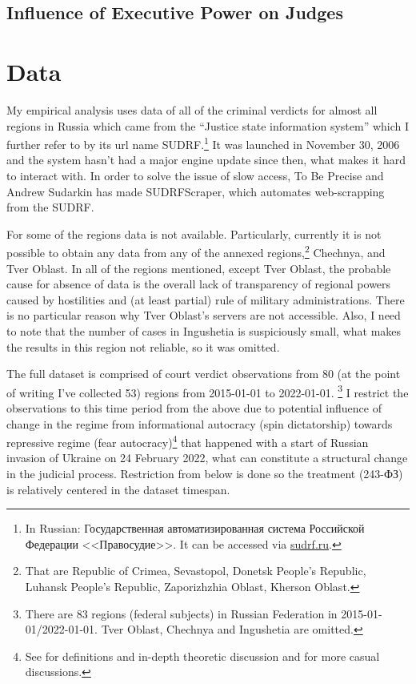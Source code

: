 \documentclass[12pt]{article}
\numberwithin{equation}{section}
\numberwithin{table}{section}
\numberwithin{figure}{section}
\begin{document}
\subsection{Influence of Executive Power on Judges}


\section{Data}

My empirical analysis uses data of all of the criminal verdicts for almost all regions in Russia which came from the ``Justice state information system'' which I further refer to by its url name SUDRF.\footnote{In Russian: Государственная автоматизированная система Российской Федерации <<Правосудие>>. It can be accessed via \url{sudrf.ru}.} 
It was launched in November 30, 2006 and the system hasn't had a major engine update since then, what makes it hard to interact with. 
In order to solve the issue of slow access, To Be Precise and Andrew Sudarkin has made SUDRFScraper, which automates web-scrapping from the SUDRF.

For some of the regions data is not available. 
Particularly, currently it is not possible to obtain any data from any of the annexed regions,\footnote{That are Republic of Crimea, Sevastopol, Donetsk People's Republic, Luhansk People's Republic, Zaporizhzhia Oblast, Kherson Oblast.} Chechnya, and Tver Oblast. 
In all of the regions mentioned, except Tver Oblast, the probable cause for absence of data is the overall lack of transparency of regional powers caused by hostilities and (at least partial) rule of military administrations. 
There is no particular reason why Tver Oblast's servers are not accessible. 
Also, I need to note that the number of cases in Ingushetia is suspiciously small, what makes the results in this region not reliable, so it was omitted. 

The full dataset is comprised of court verdict observations from 80 (at the point of writing I've collected 53) regions from 2015-01-01 to 2022-01-01. \footnote{There are $83$ regions (federal subjects) in Russian Federation in 2015-01-01/2022-01-01. Tver Oblast, Chechnya and Ingushetia are omitted. }
I restrict the observations to this time period from the above due to potential influence of change in the regime from informational autocracy (spin dictatorship) towards repressive regime (fear autocracy)\footnote{See \citet{GurievTreisman2020} for definitions and in-depth theoretic discussion and \citet{GurievTreisman2022} for more casual discussions.} that happened with a start of Russian invasion of Ukraine on 24 February 2022, what can constitute a structural change in the judicial process. 
Restriction from below is done so the treatment (243-ФЗ) is relatively centered in the dataset timespan.
\end{document}
